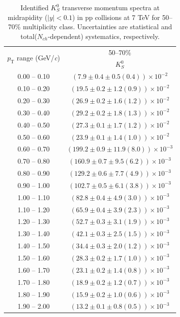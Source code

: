 \begin{table}
\caption{Identified $K^{0}_{S}$ transverse momentum spectra at midrapidity ($|y|<0.1$) in pp collisions at 7 TeV for 50--70\% multiplicity class. Uncertainties are statistical and total($N_{ch}$-dependent) systematics, respectively.}
\label{tab:K0Short_50to70}
\begin{center}
\begin{tabular}{ c | c }
\hline
\multirow{2}{*}{$p_{\mathrm{T}}$ range (GeV/\textit{c})} & \multicolumn{1}{c}{50--70\%} \\ & $K^{0}_{S}$\\ 
\hline
0.00 -- 0.10 & $(7.9\pm0.4\pm0.5(0.4))\times10^{-2}$ \\ 
0.10 -- 0.20 & $(19.5\pm0.2\pm1.2(0.9))\times10^{-2}$ \\ 
0.20 -- 0.30 & $(26.9\pm0.2\pm1.6(1.2))\times10^{-2}$ \\ 
0.30 -- 0.40 & $(29.2\pm0.2\pm1.8(1.3))\times10^{-2}$ \\ 
0.40 -- 0.50 & $(27.3\pm0.1\pm1.7(1.2))\times10^{-2}$ \\ 
0.50 -- 0.60 & $(23.9\pm0.1\pm1.4(1.0))\times10^{-2}$ \\ 
0.60 -- 0.70 & $(199.2\pm0.9\pm11.9(8.0))\times10^{-3}$ \\ 
0.70 -- 0.80 & $(160.9\pm0.7\pm9.5(6.2))\times10^{-3}$ \\ 
0.80 -- 0.90 & $(129.2\pm0.6\pm7.7(4.9))\times10^{-3}$ \\ 
0.90 -- 1.00 & $(102.7\pm0.5\pm6.1(3.8))\times10^{-3}$ \\ 
1.00 -- 1.10 & $(82.8\pm0.4\pm4.9(3.0))\times10^{-3}$ \\ 
1.10 -- 1.20 & $(65.9\pm0.4\pm3.9(2.3))\times10^{-3}$ \\ 
1.20 -- 1.30 & $(52.7\pm0.3\pm3.1(1.9))\times10^{-3}$ \\ 
1.30 -- 1.40 & $(42.1\pm0.3\pm2.5(1.5))\times10^{-3}$ \\ 
1.40 -- 1.50 & $(34.4\pm0.3\pm2.0(1.2))\times10^{-3}$ \\ 
1.50 -- 1.60 & $(28.3\pm0.2\pm1.7(1.0))\times10^{-3}$ \\ 
1.60 -- 1.70 & $(23.1\pm0.2\pm1.4(0.8))\times10^{-3}$ \\ 
1.70 -- 1.80 & $(18.9\pm0.2\pm1.2(0.7))\times10^{-3}$ \\ 
1.80 -- 1.90 & $(15.9\pm0.2\pm1.0(0.6))\times10^{-3}$ \\ 
1.90 -- 2.00 & $(13.2\pm0.1\pm0.8(0.5))\times10^{-3}$ \\ 

\end{tabular}
\end{center}
\end{table}
